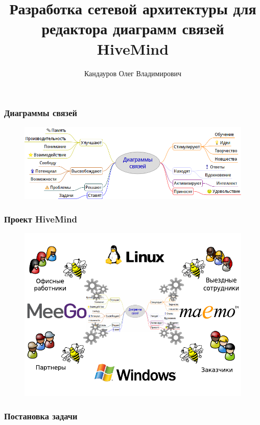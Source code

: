 \documentclass[unicode]{beamer}
\title[Разработка сетевой архитектуры для редактора HiveMind]{
Разработка сетевой архитектуры для редактора диаграмм связей HiveMind
}
\author[Кандауров О.\,В.]{Кандауров Олег Владимирович}
\institute{
Научный руководитель: ст. преподаватель Парамонов~И.\,В.
}
\date{}
\begin{document}
\maketitle
\large

\begin{frame}
\transwipe[direction=90]
\frametitle{Диаграммы связей}
\begin{figure}[h!] 
\centering
\includegraphics[width=\linewidth]{mindmap} 
\end{figure}
\end{frame}

\begin{frame}
\transwipe[direction=90]
\frametitle{Проект HiveMind}
\begin{figure}[h!] 
\centering
\includegraphics[scale=0.8]{crossplatform-collaboration} 
\end{figure}
\end{frame}

\begin{frame}
\transwipe[direction=90]
\frametitle{Постановка задачи}
\end{frame}
\end{document}
